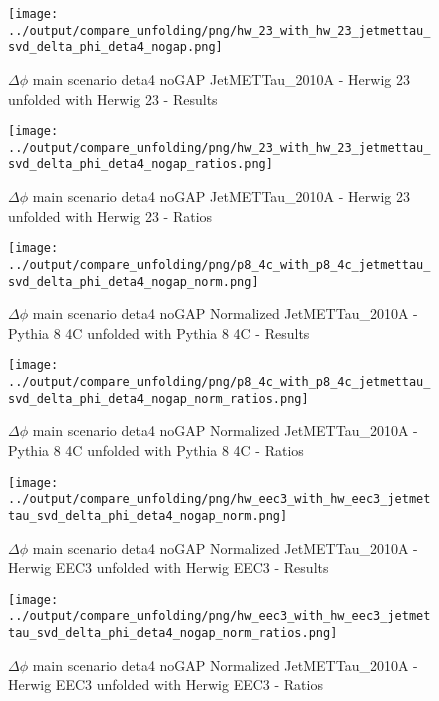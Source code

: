 \documentclass[11pt]{book}
\begin{document}
\begin{figure}[ht]
\centering
\texttt{[image: ../output/compare\_unfolding/png/hw\_23\_with\_hw\_23\_jetmettau\_svd\_delta\_phi\_deta4\_nogap.png]}
\caption{$\Delta\phi$ main scenario deta4 noGAP JetMETTau\_2010A - Herwig 23 unfolded with Herwig 23 - Results}
\label{hw_23_hw_23_jetmettau_svd_delta_phi_deta4_nogap_a}
\end{figure}

\begin{figure}[ht]
\centering
\texttt{[image: ../output/compare\_unfolding/png/hw\_23\_with\_hw\_23\_jetmettau\_svd\_delta\_phi\_deta4\_nogap\_ratios.png]}
\caption{$\Delta\phi$ main scenario deta4 noGAP JetMETTau\_2010A - Herwig 23 unfolded with Herwig 23 - Ratios}
\label{hw_23_hw_23_jetmettau_svd_delta_phi_deta4_nogap_b}
\end{figure}

\begin{figure}[ht]
\centering
\texttt{[image: ../output/compare\_unfolding/png/p8\_4c\_with\_p8\_4c\_jetmettau\_svd\_delta\_phi\_deta4\_nogap\_norm.png]}
\caption{$\Delta\phi$ main scenario deta4 noGAP Normalized JetMETTau\_2010A - Pythia 8 4C unfolded with Pythia 8 4C - Results}
\label{p8_p8_jetmettau_svd_delta_phi_deta4_nogap_norm_a}
\end{figure}

\begin{figure}[ht]
\centering
\texttt{[image: ../output/compare\_unfolding/png/p8\_4c\_with\_p8\_4c\_jetmettau\_svd\_delta\_phi\_deta4\_nogap\_norm\_ratios.png]}
\caption{$\Delta\phi$ main scenario deta4 noGAP Normalized JetMETTau\_2010A - Pythia 8 4C unfolded with Pythia 8 4C - Ratios}
\label{p8_p8_jetmettau_svd_delta_phi_deta4_nogap_norm_b}
\end{figure}

\begin{figure}[ht]
\centering
\texttt{[image: ../output/compare\_unfolding/png/hw\_eec3\_with\_hw\_eec3\_jetmettau\_svd\_delta\_phi\_deta4\_nogap\_norm.png]}
\caption{$\Delta\phi$ main scenario deta4 noGAP Normalized JetMETTau\_2010A - Herwig EEC3 unfolded with Herwig EEC3 - Results}
\label{hw_eec3_hw_eec3_jetmettau_svd_delta_phi_deta4_nogap_norm_a}
\end{figure}

\begin{figure}[ht]
\centering
\texttt{[image: ../output/compare\_unfolding/png/hw\_eec3\_with\_hw\_eec3\_jetmettau\_svd\_delta\_phi\_deta4\_nogap\_norm\_ratios.png]}
\caption{$\Delta\phi$ main scenario deta4 noGAP Normalized JetMETTau\_2010A - Herwig EEC3 unfolded with Herwig EEC3 - Ratios}
\label{hw_eec3_hw_eec3_jetmettau_svd_delta_phi_deta4_nogap_norm_b}
\end{figure}
\end{document}
